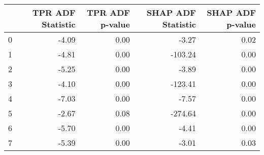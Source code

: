 \begin{tabular}{lrrrr}
\toprule
 & TPR ADF Statistic & TPR ADF p-value & SHAP ADF Statistic & SHAP ADF p-value \\
\midrule
0 & -4.09 & 0.00 & -3.27 & 0.02 \\
1 & -4.81 & 0.00 & -103.24 & 0.00 \\
2 & -5.25 & 0.00 & -3.89 & 0.00 \\
3 & -4.10 & 0.00 & -123.41 & 0.00 \\
4 & -7.03 & 0.00 & -7.57 & 0.00 \\
5 & -2.67 & 0.08 & -274.64 & 0.00 \\
6 & -5.70 & 0.00 & -4.41 & 0.00 \\
7 & -5.39 & 0.00 & -3.01 & 0.03 \\
\bottomrule
\end{tabular}
